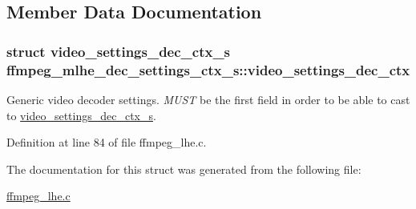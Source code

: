 \subsection{Member Data Documentation}
\subsubsection[{\texorpdfstring{video\+\_\+settings\+\_\+dec\+\_\+ctx}{video_settings_dec_ctx}}]{\setlength{\rightskip}{0pt plus 5cm}struct {\bf video\+\_\+settings\+\_\+dec\+\_\+ctx\+\_\+s} ffmpeg\+\_\+mlhe\+\_\+dec\+\_\+settings\+\_\+ctx\+\_\+s\+::video\+\_\+settings\+\_\+dec\+\_\+ctx}\hypertarget{structffmpeg__mlhe__dec__settings__ctx__s_a82ab7d852e7f75a75a21127ede393026}{}\label{structffmpeg__mlhe__dec__settings__ctx__s_a82ab7d852e7f75a75a21127ede393026}
Generic video decoder settings. {\itshape M\+U\+ST} be the first field in order to be able to cast to \hyperlink{structvideo__settings__dec__ctx__s}{video\+\_\+settings\+\_\+dec\+\_\+ctx\+\_\+s}. 

Definition at line 84 of file ffmpeg\+\_\+lhe.\+c.



The documentation for this struct was generated from the following file\+:\begin{DoxyCompactItemize}
\item 
\hyperlink{ffmpeg__lhe_8c}{ffmpeg\+\_\+lhe.\+c}\end{DoxyCompactItemize}
